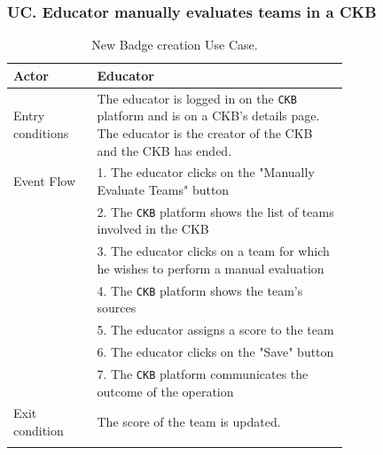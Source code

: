 \subsubsection*{UC\cuc . Educator manually evaluates teams in a CKB}
\begin{center}
    \begin{longtable}{lp{0.75\linewidth}}
        \hline
        Actor            & Educator \\
        \hline
        Entry conditions & The educator is logged in on the \verb|CKB| platform and is on a CKB's details page. The educator is the creator of the CKB and the CKB has ended.\\
        \hline
        Event Flow      
        & 1. The educator clicks on the "Manually Evaluate Teams" button\\
        & 2. The \verb|CKB| platform shows the list of teams involved in the CKB\\
        & 3. The educator clicks on a team for which he wishes to perform a manual evaluation\\
        & 4. The \verb|CKB| platform shows the team's sources\\
        & 5. The educator assigns a score to the team\\
        & 6. The educator clicks on the "Save" button\\
        & 7. The \verb|CKB| platform communicates the outcome of the operation\\
        \hline
        Exit condition   & The score of the team is updated.   \\        
        \hline
        \caption{New Badge creation Use Case.}
        \label{tab: manual_evaluation_use_case}
    \end{longtable}

\end{center}


